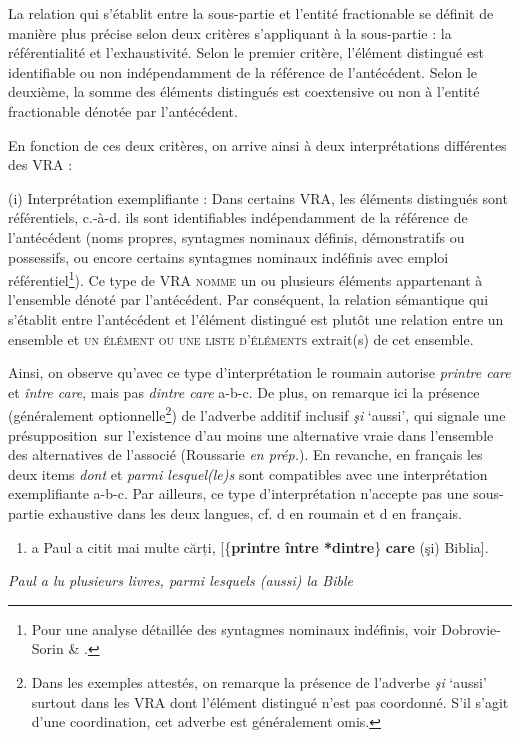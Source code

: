 La relation qui s'établit entre la sous-partie et l'entité fractionable se définit de manière plus précise selon deux critères s'appliquant à la sous-partie : la référentialité et l'exhaustivité. Selon le premier critère, l'élément distingué est identifiable ou non indépendamment de la référence de l'antécédent. Selon le deuxième, la somme des éléments distingués est coextensive ou non à l'entité fractionable dénotée par l'antécédent.  

En fonction de ces deux critères, on arrive ainsi à deux interprétations différentes des VRA : 

(i) Interprétation exemplifiante : Dans certains VRA, les éléments distingués sont référentiels, c.-à-d. ils sont identifiables indépendamment de la référence de l'antécédent (noms propres, syntagmes nominaux définis, démonstratifs ou possessifs, ou encore certains syntagmes nominaux indéfinis avec emploi référentiel\footnote{Pour une analyse détaillée des syntagmes nominaux indéfinis, voir Dobrovie-Sorin \& \citet{Beyssade2004}.}). Ce type de VRA \textsc{nomme} un ou plusieurs éléments appartenant à l'ensemble dénoté par l'antécédent. Par conséquent, la relation sémantique qui s'établit entre l'antécédent et l'élément distingué est plutôt une relation entre un ensemble et \textsc{un élément ou une liste d'éléments} extrait(s) de cet ensemble. 

Ainsi, on observe qu'avec ce type d'interprétation le roumain autorise \textit{printre care} et \textit{între care}, mais pas\textit{ dintre care} a-b-c. De plus, on remarque ici la présence (généralement optionnelle\footnote{Dans les exemples attestés, on remarque la présence de l'adverbe \textit{şi} `aussi' surtout dans les VRA dont l'élément distingué n'est pas coordonné. S'il s'agit d'une coordination, cet adverbe est généralement omis.}) de l'adverbe additif inclusif \textit{şi} `aussi', qui signale une présupposition~sur l'existence d'au moins une alternative vraie dans l'ensemble des alternatives de l'associé (Roussarie \textit{en prép.}). En revanche, en français les deux items \textit{dont} et \textit{parmi lesquel(le)s} sont compatibles avec une interprétation exemplifiante a-b-c. Par ailleurs, ce type d'interprétation n'accepte pas une sous-partie exhaustive dans les deux langues, cf. d en roumain et d en français.


\begin{enumerate}
\item \label{bkm:Ref295148219}a  Paul a citit mai multe cărți, [\{\textbf{printre {\textbar} între {\textbar} *dintre}\} \textbf{care} (şi) Biblia].  


\end{enumerate}
{\itshape
Paul a lu plusieurs livres, parmi lesquels (aussi) la Bible}


